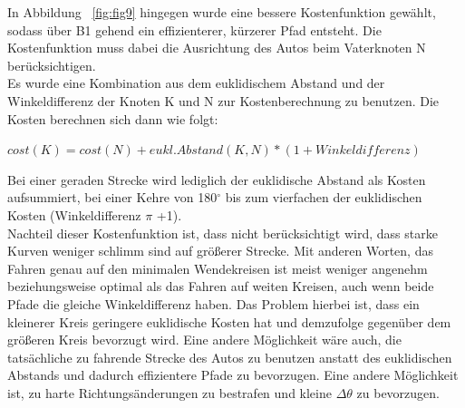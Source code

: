 In Abbildung ~\ref{fig:fig9} hingegen wurde eine bessere Kostenfunktion gewählt, sodass über B1 gehend ein effizienterer, kürzerer Pfad entsteht. Die Kostenfunktion muss dabei die Ausrichtung des Autos beim Vaterknoten N berücksichtigen. \\
Es wurde eine Kombination aus dem euklidischem Abstand und der Winkeldifferenz der Knoten K und N zur Kostenberechnung zu benutzen. Die Kosten berechnen sich dann wie folgt: 
\begin{center}
$cost(K) = cost(N) +eukl. Abstand(K,N) * (1+Winkeldifferenz)$
\end{center} 
Bei einer geraden Strecke wird lediglich der euklidische Abstand als Kosten aufsummiert, bei einer Kehre von 180$^{\circ}$ bis zum vierfachen der euklidischen Kosten (Winkeldifferenz $\pi$ +1).\\
Nachteil dieser Kostenfunktion ist, dass nicht berücksichtigt wird, dass starke Kurven weniger schlimm sind auf größerer Strecke. Mit anderen Worten, das Fahren genau auf den minimalen Wendekreisen ist meist weniger angenehm beziehungsweise optimal als das Fahren auf weiten Kreisen, auch wenn beide Pfade die gleiche Winkeldifferenz haben. Das Problem hierbei ist, dass ein kleinerer Kreis geringere euklidische Kosten hat und demzufolge gegenüber dem größeren Kreis bevorzugt wird. Eine andere Möglichkeit wäre auch, die tatsächliche zu fahrende Strecke des Autos zu benutzen anstatt des euklidischen Abstands und dadurch effizientere Pfade zu bevorzugen. Eine andere Möglichkeit ist, zu harte Richtungsänderungen zu bestrafen und kleine $ \Delta \theta$ zu bevorzugen. \\
